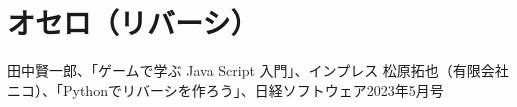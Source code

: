 \documentclass[uplatex,a4paper,11pt,oneside,openany]{jsbook}
\makeatletter
\renewcommand{\chapter}{%
\if@openright\cleardoublepage\else\clearpage\fi
\global\@topnum\z@
\secdef\@chapter\@schapter
}
\makeatother
\begin{document}


\newpage

\section{オセロ（リバーシ）}



%
%

%
\begin{thebibliography}{99}
	 田中賢一郎、「ゲームで学ぶ Java Script 入門」、インプレス
	 松原拓也（有限会社ニコ）、「Pythonでリバーシを作ろう」、日経ソフトウェア2023年5月号
\end{thebibliography}
%
\end{document}
